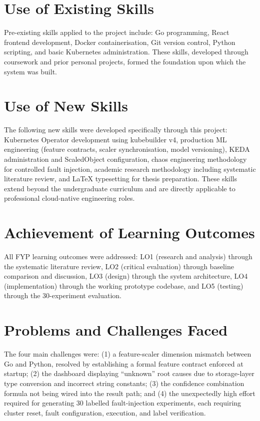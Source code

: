 \section{Use of Existing Skills}
Pre-existing skills applied to the project include: Go programming, React frontend development, Docker containerisation, Git version control, Python scripting, and basic Kubernetes administration. These skills, developed through coursework and prior personal projects, formed the foundation upon which the system was built.

\section{Use of New Skills}
The following new skills were developed specifically through this project: Kubernetes Operator development using kubebuilder v4, production ML engineering (feature contracts, scaler synchronisation, model versioning), KEDA administration and ScaledObject configuration, chaos engineering methodology for controlled fault injection, academic research methodology including systematic literature review, and LaTeX typesetting for thesis preparation. These skills extend beyond the undergraduate curriculum and are directly applicable to professional cloud-native engineering roles.

\section{Achievement of Learning Outcomes}
All FYP learning outcomes were addressed: LO1 (research and analysis) through the systematic literature review, LO2 (critical evaluation) through baseline comparison and discussion, LO3 (design) through the system architecture, LO4 (implementation) through the working prototype codebase, and LO5 (testing) through the 30-experiment evaluation.

\section{Problems and Challenges Faced}
The four main challenges were: (1) a feature-scaler dimension mismatch between Go and Python, resolved by establishing a formal feature contract enforced at startup; (2) the dashboard displaying ``unknown'' root causes due to storage-layer type conversion and incorrect string constants; (3) the confidence combination formula not being wired into the result path; and (4) the unexpectedly high effort required for generating 30 labelled fault-injection experiments, each requiring cluster reset, fault configuration, execution, and label verification.

